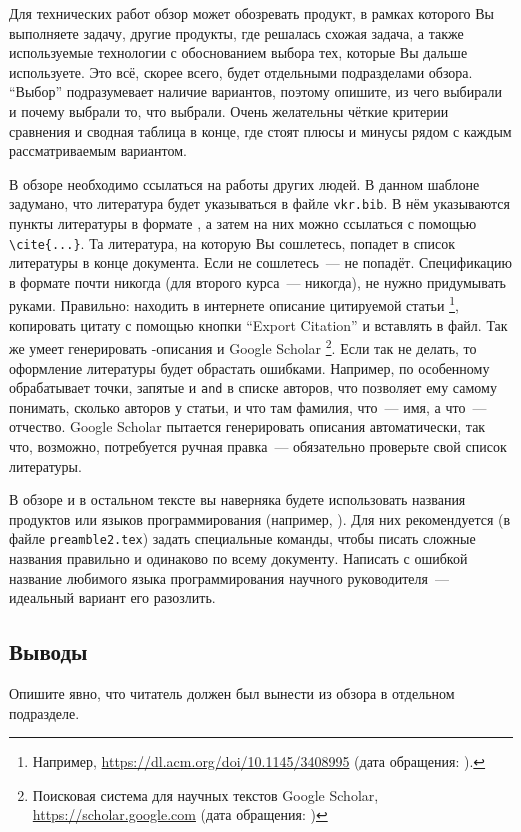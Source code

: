 Для технических работ обзор может обозревать продукт, в рамках которого Вы выполняете задачу, другие продукты, где решалась схожая задача, а также используемые технологии с обоснованием выбора тех, которые Вы дальше используете.
Это всё, скорее всего, будет отдельными подразделами обзора.
\enquote{Выбор} подразумевает наличие вариантов, поэтому опишите, из чего выбирали и почему выбрали то, что выбрали.
Очень желательны чёткие критерии сравнения и сводная таблица в конце, где стоят плюсы и минусы рядом с каждым рассматриваемым вариантом.

В обзоре необходимо ссылаться на работы других людей.
В данном шаблоне задумано, что литература будет указываться в файле \verb=vkr.bib=.
В нём указываются пункты литературы в формате \BibTeX{}, а затем на них можно ссылаться с помощью \verb=\cite{...}=.
Та литература, на которую Вы сошлетесь, попадет в список литературы в конце документа.
Если не сошлетесь~---  не попадёт.
Спецификацию в формате \BibTeX{} почти никогда (для второго курса~--- никогда), не нужно придумывать руками.
Правильно: находить в интернете описание цитируемой статьи%
\footnote{Например, \url{https://dl.acm.org/doi/10.1145/3408995} (дата обращения: ).},
копировать цитату с помощью кнопки \foreignquote{english}{Export Citation} и вставлять в \BibTeX{} файл.
Так же умеет генерировать \BibTeX{}-описания и Google Scholar%
\footnote{Поисковая система для научных текстов Google Scholar, \url{https://scholar.google.com} (дата обращения: )}.
Если так не делать, то оформление литературы будет обрастать ошибками.
Например, \BibTeX{} по особенному обрабатывает точ\-ки, запятые и \verb=and= в списке авторов, что позволяет ему самому понимать, сколько авторов у статьи, и что там фамилия, что~--- имя, а что~--- отчество.
Google Scholar пытается генерировать описания автоматически, так что, возможно, потребуется ручная правка~--- обязательно проверьте свой список литературы.

В обзоре и в остальном тексте вы наверняка будете использовать названия продуктов или языков программирования (например, \csharp{}).
Для них рекоменду\-ется (в файле \verb=preamble2.tex=) за\-дать специальные команды, чтобы писать сложные названия правильно и одинаково по всему доку\-менту.
Написать с ошибкой  название любимого языка программирова\-ния науч\-ного руко\-водителя~--- идеальный вариант его разозлить.

\subsection{Выводы}

Опишите явно, что читатель должен был вынести из обзора в отдельном подразделе.

